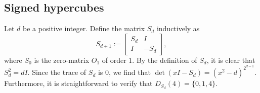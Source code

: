 \documentclass[11pt]{article}
\newtheorem{example}[theorem]{Example}
\begin{document}
\subsection{Signed hypercubes}\label{sec:signed}




Let $d$ be a positive integer. %
Define the matrix $S_d$ inductively as
\[
S_{d+1} := \begin{bmatrix}
S_d & I\\
I & -S_d
\end{bmatrix},
\]
where $S_0$ is the zero-matrix $O_1$ of order $1$.
By the definition of $S_d$, it is clear that $S_d^2 = d I$.
Since the trace of $S_d$ is $0$, we find that $\det(xI-S_d) = (x^2-d)^{2^{d-1}}$.
Furthermore, it is straightforward to verify that $D_{S_d}(4)=\{0,1,4\}$. 
\end{document}
